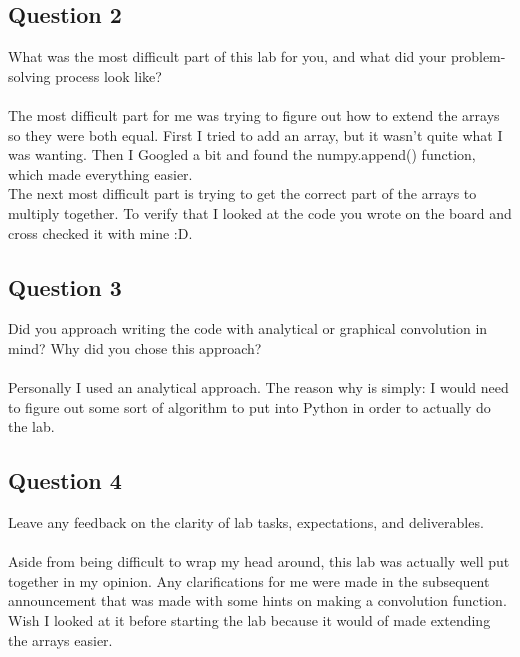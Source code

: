 \documentclass[12pt,a4paper]{article}
\begin{document}
\subsection{Question 2}
What was the most difficult part of this lab for you, and what did your problem-solving
process look like?\\
\\
The most difficult part for me was trying to figure out how to extend the arrays so they were both equal. First I tried to add an array, but it wasn't quite what I was wanting. Then I Googled a bit and found the numpy.append() function, which made everything easier.\\
The next most difficult part is trying to get the correct part of the arrays to multiply together. To verify that I looked at the code you wrote on the board and cross checked it with mine :D.\\
\subsection{Question 3}
Did you approach writing the code with analytical or graphical convolution in mind? Why
did you chose this approach?\\
\\
Personally I used an analytical approach. The reason why is simply: I would need to figure out some sort of algorithm to put into Python in order to actually do the lab.\\
\subsection{Question 4}
Leave any feedback on the clarity of lab tasks, expectations, and deliverables.\\
\\
Aside from being difficult to wrap my head around, this lab was actually well put together in my opinion. Any clarifications for me were made in the subsequent announcement that was made with some hints on making a convolution function. Wish I looked at it before starting the lab because it would of made extending the arrays easier.
\end{document}
